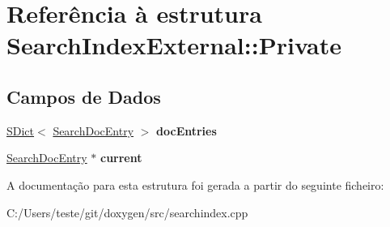 \hypertarget{struct_search_index_external_1_1_private}{\section{Referência à estrutura Search\-Index\-External\-:\-:Private}
\label{struct_search_index_external_1_1_private}
}
\subsection*{Campos de Dados}
\begin{DoxyCompactItemize}
\item 
\hypertarget{struct_search_index_external_1_1_private_a239d24fda00fb7a8197e60e42ff88846}{\hyperlink{class_s_dict}{S\-Dict}$<$ \hyperlink{struct_search_doc_entry}{Search\-Doc\-Entry} $>$ {\bfseries doc\-Entries}}\label{struct_search_index_external_1_1_private_a239d24fda00fb7a8197e60e42ff88846}

\item 
\hypertarget{struct_search_index_external_1_1_private_a05b146cc864bf97aaad4620a1ee14dbf}{\hyperlink{struct_search_doc_entry}{Search\-Doc\-Entry} $\ast$ {\bfseries current}}\label{struct_search_index_external_1_1_private_a05b146cc864bf97aaad4620a1ee14dbf}

\end{DoxyCompactItemize}


A documentação para esta estrutura foi gerada a partir do seguinte ficheiro\-:\begin{DoxyCompactItemize}
\item 
C\-:/\-Users/teste/git/doxygen/src/searchindex.\-cpp\end{DoxyCompactItemize}
